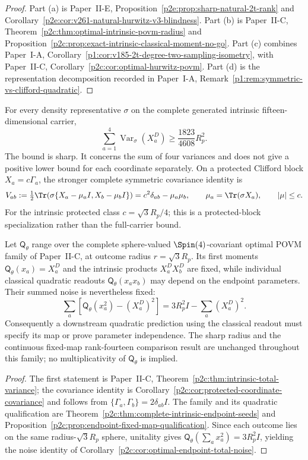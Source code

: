 \documentclass[12pt,a4paper]{article}
\begin{document}
\begin{proof}
Part (a) is Paper~II-E, Proposition~\ref{p2e:prop:sharp-natural-2t-rank} and Corollary~\ref{p2e:cor:v261-natural-hurwitz-v3-blindness}.  Part (b) is Paper~II-C,
Theorem~\ref{p2c:thm:optimal-intrinsic-povm-radius} and
Proposition~\ref{p2c:prop:exact-intrinsic-classical-moment-no-go}.  Part (c)
combines Paper~I-A, Corollary~\ref{p1:cor:v185-2t-degree-two-sampling-isometry},
with Paper~II-C, Corollary~\ref{p2c:cor:optimal-hurwitz-povm}.  Part (d) is the
representation decomposition recorded in Paper~I-A,
Remark~\ref{p1:rem:symmetric-vs-clifford-quadratic}.
\end{proof}
\begin{proposition}
\label{p4:prop:intrinsic-localization-moment-transport}
For every density representative \(\sigma\) on the complete generated
intrinsic fifteen-dimensional carrier,
\[
 \boxed{\sum_{a=1}^4\operatorname{Var}_\sigma(X_a^D)
 \ge\frac{1823}{4608}R_p^2.}
\]
The bound is sharp.  It concerns the sum of four variances and does not
give a positive lower bound for each coordinate separately.  On a protected
Clifford block \(X_a=c\Gamma_a\), the stronger complete symmetric
covariance identity is
\[
 V_{ab}:=\tfrac12\Tr\!\left(\sigma
 \{X_a-\mu_aI,X_b-\mu_bI\}\right)
 =c^2\delta_{ab}-\mu_a\mu_b,
 \qquad \mu_a=\Tr(\sigma X_a),\qquad |\mu|\le c.
\]
For the intrinsic protected class \(c=\sqrt3R_p/4\); this is a
protected-block specialization rather than the full-carrier bound.

Let \(\mathsf Q_\theta\) range over the complete sphere-valued
\(\Spin(4)\)-covariant optimal POVM family of Paper~II-C, at outcome
radius \(r=\sqrt3R_p\).  Its first moments
\(\mathsf Q_\theta(x_a)=X_a^D\) and the intrinsic products
\(X_a^DX_b^D\) are fixed, while individual classical quadratic readouts
\(\mathsf Q_\theta(x_ax_b)\) may depend on the endpoint parameters.
Their summed noise is nevertheless fixed:
\[
 \sum_a\left[\mathsf Q_\theta(x_a^2)-(X_a^D)^2\right]
 =3R_p^2I-\sum_a(X_a^D)^2.
\]
Consequently a downstream quadratic prediction using the classical
readout must specify its map or prove parameter independence.  The sharp
radius and the continuous fixed-map rank-fourteen comparison result are
unchanged throughout this family; no multiplicativity of
\(\mathsf Q_\theta\) is implied.
\end{proposition}

\begin{proof}
The first statement is Paper~II-C,
Theorem~\ref{p2c:thm:intrinsic-total-variance}; the covariance identity is
Corollary~\ref{p2c:cor:protected-coordinate-covariance} and follows from
\(\{\Gamma_a,\Gamma_b\}=2\delta_{ab}I\).
The family and its quadratic qualification are
Theorem~\ref{p2c:thm:complete-intrinsic-endpoint-seeds} and
Proposition~\ref{p2c:prop:endpoint-fixed-map-qualification}.  Since each
outcome lies on the same radius-\(\sqrt3R_p\) sphere, unitality gives
\(\mathsf Q_\theta(\sum_a x_a^2)=3R_p^2I\), yielding the noise identity
of Corollary~\ref{p2c:cor:optimal-endpoint-total-noise}.
\end{proof}
\end{document}
